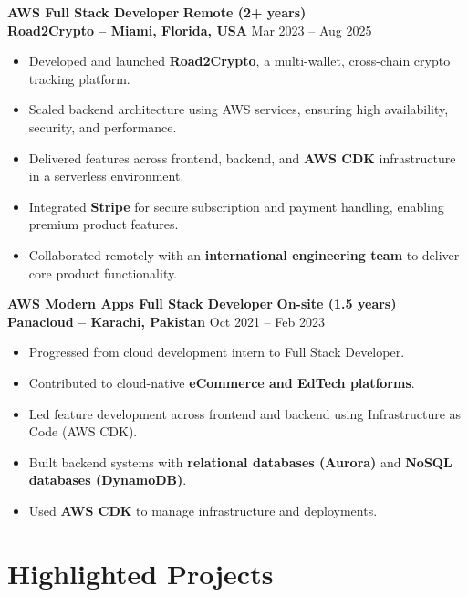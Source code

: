 \documentclass[a4paper,12pt]{article}
\begin{document}
\textbf{AWS Full Stack Developer} \hfill \textbf{Remote (2+ years)} \\
\textbf{Road2Crypto – Miami, Florida, USA} \hfill Mar 2023 -- Aug 2025
\begin{itemize}
    \item Developed and launched \textbf{Road2Crypto}, a multi-wallet, cross-chain crypto tracking platform.
    \item Scaled backend architecture using AWS services, ensuring high availability, security, and performance.
    \item Delivered features across frontend, backend, and \textbf{AWS CDK} infrastructure in a serverless environment.
    \item Integrated \textbf{Stripe} for secure subscription and payment handling, enabling premium product features.
    \item Collaborated remotely with an \textbf{international engineering team} to deliver core product functionality.
\end{itemize}

\textbf{AWS Modern Apps Full Stack Developer} \hfill \textbf{On-site (1.5 years)} \\
\textbf{Panacloud – Karachi, Pakistan} \hfill Oct 2021 -- Feb 2023
\begin{itemize}
    \item Progressed from cloud development intern to Full Stack Developer. 
    \item Contributed to cloud-native \textbf{eCommerce and EdTech platforms}.
    \item Led feature development across frontend and backend using Infrastructure as Code (AWS CDK).
    \item Built backend systems with \textbf{relational databases (Aurora)} and \textbf{NoSQL databases (DynamoDB)}.
    \item Used \textbf{AWS CDK} to manage infrastructure and deployments.
\end{itemize}

\section*{Highlighted Projects}
\vspace{2pt} %
\end{document}

